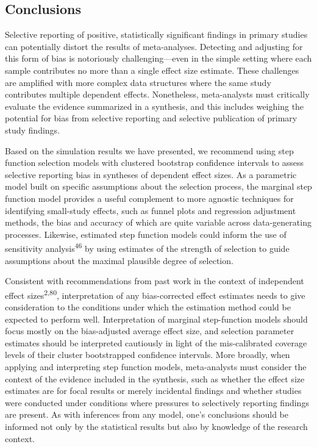 \documentclass[
  man, donotrepeattitle,floatsintext]{apa7}
\begin{document}
\subsection{Conclusions}\label{conclusions}

Selective reporting of positive, statistically significant findings in primary studies can potentially distort the results of meta-analyses.
Detecting and adjusting for this form of bias is notoriously challenging---even in the simple setting where each sample contributes no more than a single effect size estimate.
These challenges are amplified with more complex data structures where the same study contributes multiple dependent effects.
Nonetheless, meta-analysts must critically evaluate the evidence summarized in a synthesis, and this includes weighing the potential for bias from selective reporting and selective publication of primary study findings.

Based on the simulation results we have presented, we recommend using step function selection models with clustered bootstrap confidence intervals to assess selective reporting bias in syntheses of dependent effect sizes. As a parametric model built on specific assumptions about the selection process, the marginal step function model provides a useful complement to more agnostic techniques for identifying small-study effects, such as funnel plots and regression adjustment methods, the bias and accuracy of which are quite variable across data-generating processes. Likewise, estimated step function models could inform the use of sensitivity analysis\textsuperscript{46} by using estimates of the strength of selection to guide assumptions about the maximal plausible degree of selection.

Consistent with recommendations from past work in the context of independent effect sizes\textsuperscript{2,80}, interpretation of any bias-corrected effect estimates needs to give consideration to the conditions under which the estimation method could be expected to perform well.
Interpretation of marginal step-function models should focus mostly on the bias-adjusted average effect size, and selection parameter estimates should be interpreted cautiously in light of the mis-calibrated coverage levels of their cluster bootstrapped confidence intervals.
More broadly, when applying and interpreting step function models, meta-analysts must consider the context of the evidence included in the synthesis, such as whether the effect size estimates are for focal results or merely incidental findings and whether studies were conducted under conditions where pressures to selectively reporting findings are present.
As with inferences from any model, one's conclusions should be informed not only by the statistical results but also by knowledge of the research context.
\end{document}
